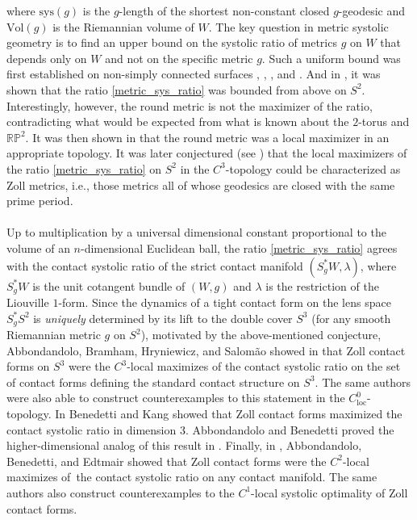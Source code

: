\documentclass[11pt]{amsart}
\theoremstyle{plain}
\theoremstyle{definition}
\theoremstyle{remark}
\begin{document}
where $\text{sys}(g)$ is the $g$-length of the shortest non-constant closed $g$-geodesic and $\text{Vol}(g)$ is the Riemannian volume of $W$.  The key question in metric systolic geometry is to find an upper bound on the systolic ratio of metrics $g$ on $W$ that depends only on $W$ and not on the specific metric $g$. Such a uniform bound was first established on non-simply connected surfaces \cite{Pu}, \cite{Bavard}, \cite{Katz_book}, and \cite[Section 7.2]{berger_book}. And in \cite{croke}, it was shown that the ratio \eqref{metric_sys_ratio} was bounded from above on $S^2$. Interestingly, however, the round metric is not the maximizer of the ratio, contradicting what would be expected from what is known about the $2$-torus and $\mathbb{RP}^2$. It was then shown in \cite{balacheff2} that the round metric was a local maximizer in an appropriate topology. It was later conjectured (see \cite{ABHS17}) that the local maximizers of the ratio \eqref{metric_sys_ratio} on $S^2$ in the $C^3$-topology could be characterized as Zoll metrics, i.e., those metrics all of whose geodesics are closed with the same prime period.\\
\\
Up to multiplication by a universal dimensional constant proportional to the volume of an $n$-dimensional Euclidean ball, the ratio \eqref{metric_sys_ratio} agrees with the contact systolic ratio of the strict contact manifold $(S^*_gW,\lambda)$, where $S^*_gW$ is the unit cotangent bundle of $(W,g)$ and $\lambda$ is the restriction of the Liouville $1$-form. Since the dynamics of a tight contact form on the lens space $S_g^*S^2$ is \emph{uniquely} determined by its lift to the double cover $S^3$ (for any smooth Riemannian metric $g$ on $S^2$), motivated by the above-mentioned conjecture, Abbondandolo, Bramham, Hryniewicz, and Salom\~{a}o showed in \cite{abhs18} that Zoll contact forms on $S^3$ were the $C^3$-local maximizes of the contact systolic ratio on the set of contact forms defining the standard contact structure on $S^3$. The same authors were also able to construct counterexamples to this statement in the $C^0_{\text{loc}}$-topology. In \cite{BKcontact} Benedetti and Kang showed that Zoll contact forms maximized the contact systolic ratio in dimension 3. Abbondandolo and Benedetti proved the higher-dimensional analog of this result in \cite{Abbondandolo-Benedetti}. Finally, in \cite{ABE_systolic}, Abbondandolo, Benedetti, and Edtmair showed that Zoll contact forms were the $C^2$-local maximizes of the contact systolic ratio on any contact manifold. The same authors also construct counterexamples to the $C^1$-local systolic optimality of Zoll contact forms.
\end{document}
